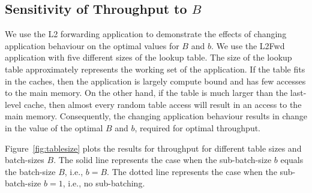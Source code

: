 
\subsection{Sensitivity of Throughput to $B$}
We use the L2 forwarding application to demonstrate the effects of changing application behaviour on the optimal
values for $B$ and $b$. We use the L2Fwd application with five different sizes of the lookup table. The size of
the lookup table approximately represents the working set of the application. If the table fits in the caches,
then the application is largely compute bound and has few accesses to the main memory. On the other hand, if the
table is much larger than the last-level cache, then almost every random table access will result in an access to
the main memory. Consequently, the changing application behaviour results in change in the value of the
optimal $B$ and $b$, required for optimal throughput.

Figure~\ref{fig:tablesize} plots the results for throughput for different table sizes and batch-sizes $B$. The solid
line represents the case when the sub-batch-size $b$ equals the batch-size $B$, i.e., $b=B$. The dotted line represents
the case when the sub-batch-size $b=1$, i.e., no sub-batching.

